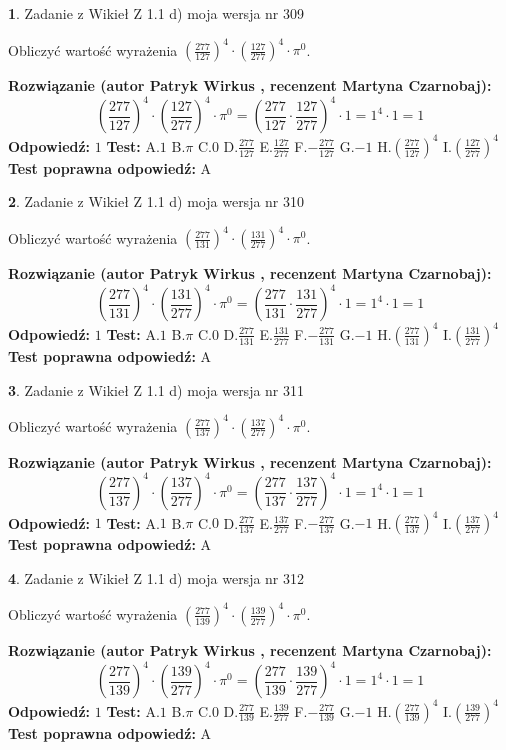 \documentclass[12pt, a4paper]{article}
\theoremstyle{definition} %
\newtheorem{zad}{}
\newcommand{\zadStart}[1]{\begin{zad}#1\newline}
\newcommand{\zadStop}{\end{zad}}
\newcommand{\rozwStart}[2]{\noindent \textbf{Rozwiązanie (autor #1 , recenzent #2): }\newline}
\newcommand{\rozwStop}{\newline}
\newcommand{\odpStart}{\noindent \textbf{Odpowiedź:}\newline}
\newcommand{\odpStop}{\newline}
\newcommand{\testStart}{\noindent \textbf{Test:}\newline}
\newcommand{\testStop}{\newline}
\newcommand{\kluczStart}{\noindent \textbf{Test poprawna odpowiedź:}\newline}
\newcommand{\kluczStop}{\newline}
\begin{document}
\zadStart{Zadanie z Wikieł Z 1.1 d) moja wersja nr 309}

Obliczyć wartość wyrażenia $(\frac{277}{127})^{4} \cdot (\frac{127}{277})^{4} \cdot \pi^{0}$.
\zadStop
\rozwStart{Patryk Wirkus}{Martyna Czarnobaj}
$$(\frac{277}{127})^{4} \cdot (\frac{127}{277})^{4} \cdot \pi^{0} = (\frac{277}{127} \cdot \frac{127}{277})^{4} \cdot 1 = 1^{4} \cdot 1 = 1$$
\rozwStop
\odpStart
$1$
\odpStop
\testStart
A.$1$ B.$\pi$ C.$0$ D.$\frac{277}{127}$ E.$\frac{127}{277}$
F.$-\frac{277}{127}$ G.$-1$
H.$(\frac{277}{127})^{4}$
I.$(\frac{127}{277})^{4}$
\testStop
\kluczStart
A
\kluczStop



\zadStart{Zadanie z Wikieł Z 1.1 d) moja wersja nr 310}

Obliczyć wartość wyrażenia $(\frac{277}{131})^{4} \cdot (\frac{131}{277})^{4} \cdot \pi^{0}$.
\zadStop
\rozwStart{Patryk Wirkus}{Martyna Czarnobaj}
$$(\frac{277}{131})^{4} \cdot (\frac{131}{277})^{4} \cdot \pi^{0} = (\frac{277}{131} \cdot \frac{131}{277})^{4} \cdot 1 = 1^{4} \cdot 1 = 1$$
\rozwStop
\odpStart
$1$
\odpStop
\testStart
A.$1$ B.$\pi$ C.$0$ D.$\frac{277}{131}$ E.$\frac{131}{277}$
F.$-\frac{277}{131}$ G.$-1$
H.$(\frac{277}{131})^{4}$
I.$(\frac{131}{277})^{4}$
\testStop
\kluczStart
A
\kluczStop



\zadStart{Zadanie z Wikieł Z 1.1 d) moja wersja nr 311}

Obliczyć wartość wyrażenia $(\frac{277}{137})^{4} \cdot (\frac{137}{277})^{4} \cdot \pi^{0}$.
\zadStop
\rozwStart{Patryk Wirkus}{Martyna Czarnobaj}
$$(\frac{277}{137})^{4} \cdot (\frac{137}{277})^{4} \cdot \pi^{0} = (\frac{277}{137} \cdot \frac{137}{277})^{4} \cdot 1 = 1^{4} \cdot 1 = 1$$
\rozwStop
\odpStart
$1$
\odpStop
\testStart
A.$1$ B.$\pi$ C.$0$ D.$\frac{277}{137}$ E.$\frac{137}{277}$
F.$-\frac{277}{137}$ G.$-1$
H.$(\frac{277}{137})^{4}$
I.$(\frac{137}{277})^{4}$
\testStop
\kluczStart
A
\kluczStop



\zadStart{Zadanie z Wikieł Z 1.1 d) moja wersja nr 312}

Obliczyć wartość wyrażenia $(\frac{277}{139})^{4} \cdot (\frac{139}{277})^{4} \cdot \pi^{0}$.
\zadStop
\rozwStart{Patryk Wirkus}{Martyna Czarnobaj}
$$(\frac{277}{139})^{4} \cdot (\frac{139}{277})^{4} \cdot \pi^{0} = (\frac{277}{139} \cdot \frac{139}{277})^{4} \cdot 1 = 1^{4} \cdot 1 = 1$$
\rozwStop
\odpStart
$1$
\odpStop
\testStart
A.$1$ B.$\pi$ C.$0$ D.$\frac{277}{139}$ E.$\frac{139}{277}$
F.$-\frac{277}{139}$ G.$-1$
H.$(\frac{277}{139})^{4}$
I.$(\frac{139}{277})^{4}$
\testStop
\kluczStart
A
\kluczStop
\end{document}
